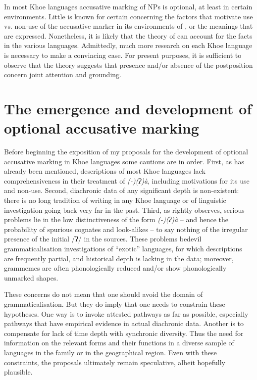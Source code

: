 \documentclass[output=paper]{LSP/langsci}
\begin{document}
In most Khoe languages accusative marking of  NPs is optional, at least in certain environments. Little is known for certain concerning the factors that motivate use vs. non-use of the accusative marker in its environments of , or the meanings that are expressed. Nonetheless, it is likely that the theory of \citet{McGregor2010Optional,McGregor2013Optionality} can account for the facts in the various languages. Admittedly, much more research on each Khoe language is necessary to make a convincing case. For present purposes, it is sufficient to observe that the theory suggests that presence and/or absence of the postposition concern joint attention and grounding.


\section{The emergence and development of optional accusative marking} \label{09-mc-sec:4}
Before beginning the exposition of my proposals for the development of optional accusative marking in Khoe languages some cautions are in order. First, as has already been mentioned, descriptions of most Khoe languages lack comprehensiveness in their treatment of \textit{(-)(ʔ)à}, including motivations for its use and non-use. Second, diachronic data of any significant depth is non-existent: there is no long tradition of writing in any Khoe language or of linguistic investigation going back very far in the past. Third, as \citet[319--320]{Fehn2014Grammar} rightly observes, serious problems lie in the low distinctiveness of the form \textit{(-)(ʔ)à} – and hence the probability of spurious cognates and look-alikes – to say nothing of the irregular presence of the initial /ʔ/ in the sources. These problems bedevil grammaticalisation investigations of “exotic” languages, for which descriptions are frequently partial, and historical depth is lacking in the data; moreover, grammemes are often phonologically reduced and/or show phonologically unmarked shapes.

These concerns do not mean that one should avoid the domain of grammaticalisation. But they do imply that one needs to constrain these hypotheses. One way is to invoke attested pathways as far as possible, especially pathways that have empirical evidence in actual diachronic data. Another is to compensate for lack of time depth with synchronic diversity. Thus the need for information on the relevant forms and their functions in a diverse sample of languages in the family or in the geographical region. Even with these constraints, the proposals ultimately remain speculative, albeit hopefully plausible.
\end{document}
